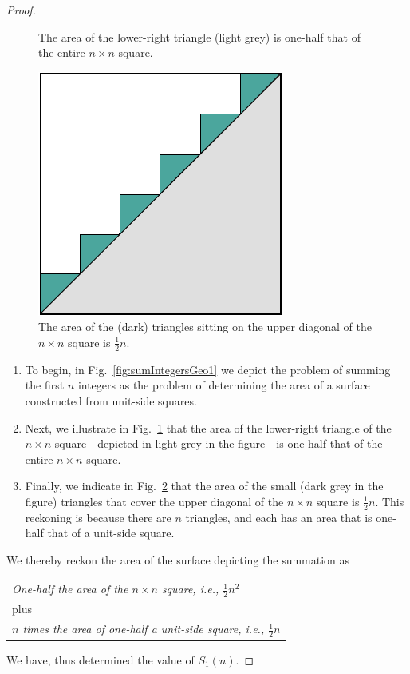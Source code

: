 \begin{proof}
\begin{figure}[ht]
\begin{center}
\caption{The area of the lower-right triangle (light grey) is one-half that of
  the entire $n \times n$ square.}
       \label{fig:sumIntegersGeo2}
\end{center}
\end{figure}
\begin{figure}[ht]
\begin{center}
       \includegraphics[scale=0.4]{FiguresMaths/SumIntegersGeometricFinal}
\caption{The area of the (dark) triangles sitting on the upper
  diagonal of the $n \times n$ square is $\frac{1}{2} n$.}
       \label{fig:sumIntegersGeo3}
\end{center}
\end{figure}
\begin{enumerate}
\item
To begin, in Fig.~\ref{fig:sumIntegersGeo1} we depict the problem of
summing the first $n$ integers as the problem of determining the area
of a surface constructed from unit-side squares.

\item
Next, we illustrate in Fig.~\ref{fig:sumIntegersGeo2} that the area of
the lower-right triangle of the $n \times n$ square---depicted in
light grey in the figure---is one-half that of the entire $n \times n$
square.

\item
Finally, we indicate in Fig.~\ref{fig:sumIntegersGeo3} that the area
of the small (dark grey in the figure) triangles that cover the upper
diagonal of the $n \times n$ square is $\frac{1}{2} n$.  This
reckoning is because there are $n$ triangles, and each has an area that
is one-half that of a unit-side square.
\end{enumerate}
We thereby reckon the area of the surface depicting the summation as

\begin{tabular}{l}
{\it One-half the area of the $n \times n$ square,
i.e., $\frac{1}{2} n^2$} \\
\hspace*{.15in} plus   \\
{\it $n$ times the area of one-half a unit-side square,
i.e., $\frac{1}{2} n$}
\end{tabular}

\noindent
We have, thus determined the value of $S_1(n)$.
\end{proof}

